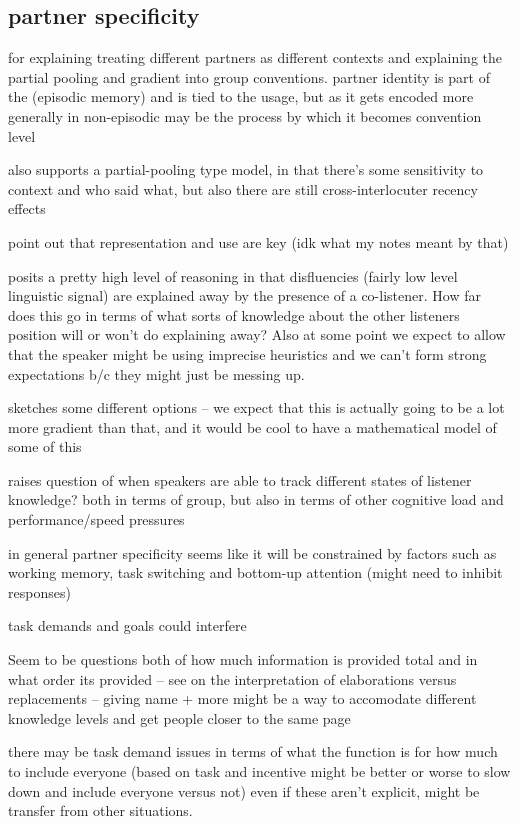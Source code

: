 \documentclass[]{article}
\begin{document}
\subsection{partner specificity}

\cite{hawkins2021} for explaining treating different partners as different contexts and explaining the partial pooling and gradient into group conventions. partner identity is part of the (episodic memory) and is tied to the usage, but as it gets encoded more generally in non-episodic may be the process by which it becomes convention level 

\cite{yoon2014} also supports a partial-pooling type model, in that there's some sensitivity to context and who said what, but also there are still cross-interlocuter recency effects

\cite{yoon2014} point out that representation and use are key (idk what my notes meant by that) 

\cite{yoon2014} posits a pretty high level of reasoning in that disfluencies (fairly low level linguistic signal) are explained away by the presence of a co-listener. How far does this go in terms of what sorts of knowledge about the other listeners position will or won't do explaining away? Also at some point we expect to allow that the speaker might be using imprecise heuristics and we can't form strong expectations b/c they might just be messing up. 

\cite{yoon2018} sketches some different options -- we expect that this is actually going to be a lot more gradient than that, and it would be cool to have a mathematical model of some of this

\cite{yoon2018} raises question of when speakers are able to track different states of listener knowledge? both in terms of group, but also in terms of other cognitive load and performance/speed pressures 

in general partner specificity seems like it will be constrained by factors such as working memory, task switching and bottom-up attention (might need to inhibit responses) 

task demands and goals could interfere

Seem to be questions both of how much information is provided total and in what order its provided -- see \cite{yoon2018} on the interpretation of elaborations versus replacements -- giving name + more might be a way to accomodate different knowledge levels and get people closer to the same page 

\cite{yoon2019} there may be task demand issues in terms of what the function is for how much to include everyone (based on task and incentive might be better or worse to slow down and include everyone versus not) even if these aren't explicit, might be transfer from other situations. 
\end{document}
